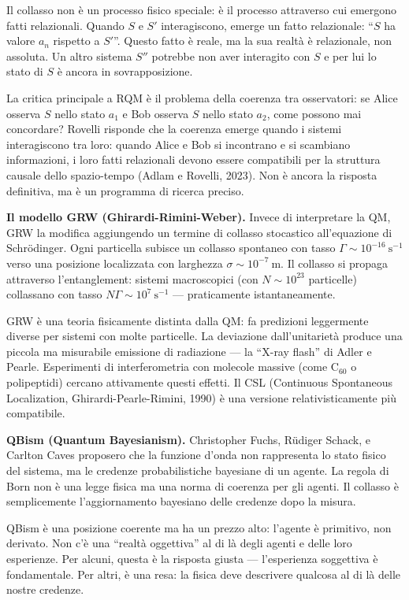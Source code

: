 \documentclass[11.5pt,a4paper,openany]{book}
\theoremstyle{remark}
\begin{document}
Il collasso non è un processo fisico speciale: è il processo attraverso cui emergono fatti relazionali. Quando $S$ e $S'$ interagiscono, emerge un fatto relazionale: ``$S$ ha valore $a_n$ rispetto a $S'$''. Questo fatto è reale, ma la sua realtà è relazionale, non assoluta. Un altro sistema $S''$ potrebbe non aver interagito con $S$ e per lui lo stato di $S$ è ancora in sovrapposizione.

La critica principale a RQM è il problema della coerenza tra osservatori: se Alice osserva $S$ nello stato $a_1$ e Bob osserva $S$ nello stato $a_2$, come possono mai concordare? Rovelli risponde che la coerenza emerge quando i sistemi interagiscono tra loro: quando Alice e Bob si incontrano e si scambiano informazioni, i loro fatti relazionali devono essere compatibili per la struttura causale dello spazio-tempo (Adlam e Rovelli, 2023). Non è ancora la risposta definitiva, ma è un programma di ricerca preciso.

\textbf{Il modello GRW (Ghirardi-Rimini-Weber).} Invece di interpretare la QM, GRW la modifica aggiungendo un termine di collasso stocastico all'equazione di Schrödinger. Ogni particella subisce un collasso spontaneo con tasso $\Gamma \sim 10^{-16}\ \text{s}^{-1}$ verso una posizione localizzata con larghezza $\sigma \sim 10^{-7}\ \text{m}$. Il collasso si propaga attraverso l'entanglement: sistemi macroscopici (con $N \sim 10^{23}$ particelle) collassano con tasso $N\Gamma \sim 10^7\ \text{s}^{-1}$ --- praticamente istantaneamente.

GRW è una teoria fisicamente distinta dalla QM: fa predizioni leggermente diverse per sistemi con molte particelle. La deviazione dall'unitarietà produce una piccola ma misurabile emissione di radiazione --- la ``X-ray flash'' di Adler e Pearle. Esperimenti di interferometria con molecole massive (come C$_{60}$ o polipeptidi) cercano attivamente questi effetti. Il CSL (Continuous Spontaneous Localization, Ghirardi-Pearle-Rimini, 1990) è una versione relativisticamente più compatibile.

\textbf{QBism (Quantum Bayesianism).} Christopher Fuchs, Rüdiger Schack, e Carlton Caves proposero che la funzione d'onda non rappresenta lo stato fisico del sistema, ma le credenze probabilistiche bayesiane di un agente. La regola di Born non è una legge fisica ma una norma di coerenza per gli agenti. Il collasso è semplicemente l'aggiornamento bayesiano delle credenze dopo la misura.

QBism è una posizione coerente ma ha un prezzo alto: l'agente è primitivo, non derivato. Non c'è una ``realtà oggettiva'' al di là degli agenti e delle loro esperienze. Per alcuni, questa è la risposta giusta --- l'esperienza soggettiva è fondamentale. Per altri, è una resa: la fisica deve descrivere qualcosa al di là delle nostre credenze.
\end{document}
